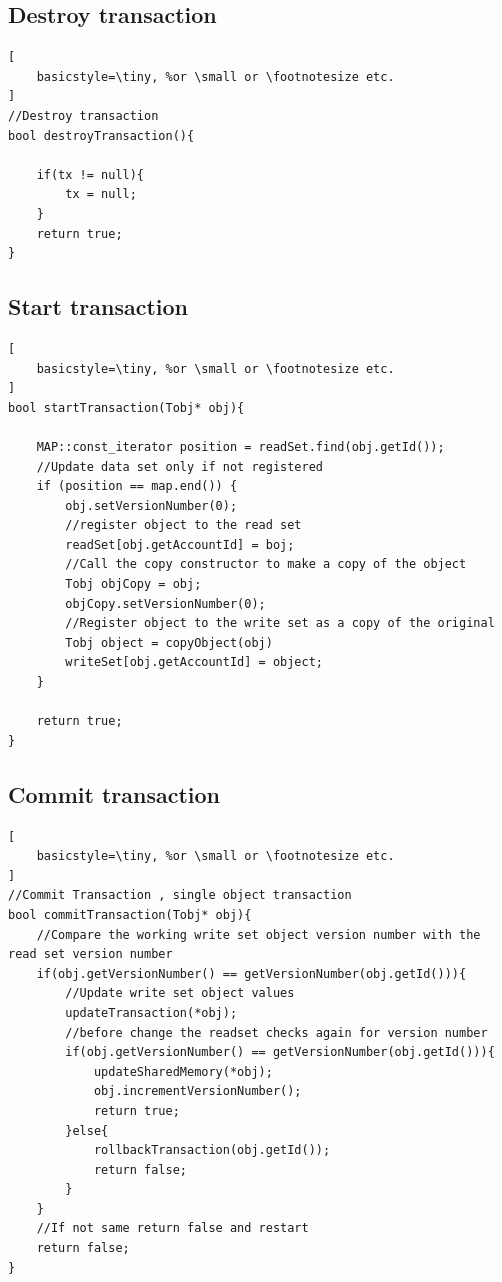 \documentclass[12pt]{article}
\begin{document}
\subsection{Destroy transaction}
\begin{lstlisting}[
    basicstyle=\tiny, %or \small or \footnotesize etc.
]
//Destroy transaction
bool destroyTransaction(){

	if(tx != null){
		tx = null;
	}
	return true;
}
\end{lstlisting}

\subsection{Start transaction}
\begin{lstlisting}[
    basicstyle=\tiny, %or \small or \footnotesize etc.
]
bool startTransaction(Tobj* obj){

	MAP::const_iterator position = readSet.find(obj.getId());
	//Update data set only if not registered
	if (position == map.end()) {
		obj.setVersionNumber(0);
	    //register object to the read set
		readSet[obj.getAccountId] = boj;
		//Call the copy constructor to make a copy of the object
		Tobj objCopy = obj;
		objCopy.setVersionNumber(0);
		//Register object to the write set as a copy of the original
		Tobj object = copyObject(obj)
		writeSet[obj.getAccountId] = object;
	} 
	
	return true;
}
\end{lstlisting}


\subsection{Commit transaction}
\begin{lstlisting}[
    basicstyle=\tiny, %or \small or \footnotesize etc.
]
//Commit Transaction , single object transaction
bool commitTransaction(Tobj* obj){
	//Compare the working write set object version number with the read set version number
	if(obj.getVersionNumber() == getVersionNumber(obj.getId())){
		//Update write set object values
		updateTransaction(*obj);
		//before change the readset checks again for version number
		if(obj.getVersionNumber() == getVersionNumber(obj.getId())){
			updateSharedMemory(*obj);
			obj.incrementVersionNumber();
			return true;
		}else{
			rollbackTransaction(obj.getId());
			return false;
		}
	}
	//If not same return false and restart
	return false;
}
\end{lstlisting}
\end{document}
